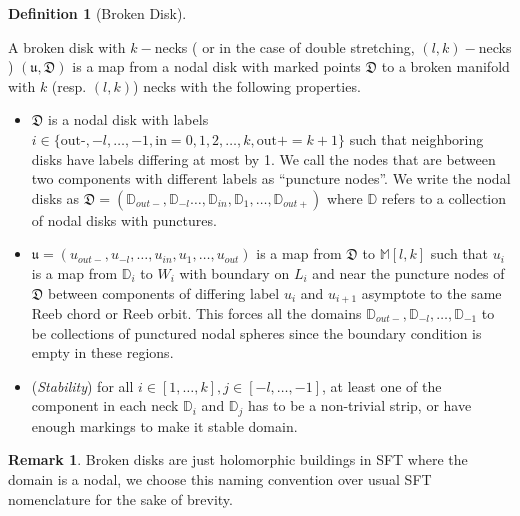 \documentclass[11pt, oneside,dvipsnames]{amsart}
\newcommand{\D}{\mathbb{D}}
\newcommand{\<}{\langle}
\renewcommand{\>}{\rangle}
\newcommand{\outm}{{out-}}
\newcommand{\bD}{\mathbb{D}}
\theoremstyle{definition}
\theoremstyle{definition}
\newtheorem{remark}[Theorem]{Remark}
\newtheorem{defn}[Theorem]{Definition}
\numberwithin{equation}{subsection}
\begin{document}
    
 \begin{defn}[Broken Disk]\label{def:brokdisk}
 
 A broken disk with $k-$necks ( or in the case of double stretching,  $(l,k)-$necks ) $(\mathfrak{u,D})$ is a map from a  nodal disk with marked points $\mathfrak{D}$ to a broken manifold with $k$ (resp. $(l,k)$) necks with the following properties. 
 \begin{itemize}
     \item $\mathfrak{D}$ is a nodal disk with labels $i\in \{\text{out-},-l, \dots,-1,\text{in}=0,1,2,\dots,k,\text{out+}=k+1\}$ such that neighboring disks have labels differing at most by 1. We call the nodes that are between two components with different labels as ``puncture nodes''. We write the nodal disks as  $ \mathfrak{D} = (\bD_\outm,\bD_{-l}\dots, \bD_{in},\bD_1,\dots,\bD_{out+})$ where $\bD$ refers to a collection of nodal disks with punctures. 
     \item  $ \mathfrak{u} = (u_\outm,u_{-l}, \dots , u_{in}, u_1,\dots,u_{out})$ is a map from $\mathfrak{D}$ to $\mathbb{M}[l,k]$ such that  $u_i$ is a map from $\D_i$ to $W_i$ with boundary on $L_i$ and near the puncture nodes of $\mathfrak{D}$ between components of differing label $u_i$ and $u_{i+1}$ asymptote to the same Reeb chord or Reeb orbit. This forces all the domains $\bD_\outm,\bD_{-l},\dots, \bD_{-1}$ to be collections of punctured nodal spheres since the boundary condition is empty in these regions.
     \item (\textit{Stability}) for all $i \in [1,\dots,k], j\in [-l,\dots,-1]$, at least one of the component in each neck $\bD_i$ and $\bD_j$ has to be a non-trivial strip, or have enough markings to make it stable domain.
 \end{itemize}
  \end{defn}
\begin{remark}
    Broken disks are just holomorphic buildings in SFT where the domain is a nodal, we choose this naming convention over usual SFT nomenclature for the sake of brevity.
\end{remark}
\end{document}
